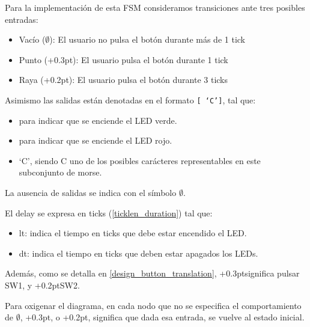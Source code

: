 \documentclass[a4paper,openright,12pt]{article}
\newcommand{\punto}{\kern+0.3pt\raisebox{0.35ex}{\huge\textbf.}}
\newcommand{\raya}{\kern+0.2pt\raisebox{-0.35ex}{\huge\textbf-}}
\begin{document}
Para la implementación de esta FSM consideramos transiciones ante tres posibles entradas:
\begin{itemize}
    \item Vacío ($\emptyset$): El usuario no pulsa el botón durante más de 1 tick
    \item Punto (\punto): El usuario pulsa el botón durante 1 tick
    \item Raya (\raya): El usuario pulsa el botón durante 3 ticks
\end{itemize}

Asimismo las salidas están denotadas en el formato \texttt{[\text{\textcolor{green}{\punto}}\text{\textcolor{red}{\punto}} `C']}, tal que:
\begin{itemize}
    \item \text{\textcolor{green}{\punto}} para indicar que se enciende el LED verde.
    \item \text{\textcolor{red}{\punto}} para indicar que se enciende el LED rojo.
    \item `C', siendo C uno de los posibles carácteres representables en este subconjunto de morse.
\end{itemize}

La ausencia de salidas se indica con el símbolo $\emptyset$.
\bigskip

El delay se expresa en ticks (\ref{ticklen_duration}) tal que:
\begin{itemize}
    \item lt: indica el tiempo en ticks que debe estar encendido el LED.
    \item dt: indica el tiempo en ticks que deben estar apagados los LEDs.
\end{itemize}
\bigskip

Además, como se detalla en \ref{design_button_translation}, \punto \space significa pulsar SW1, y \raya \space SW2.
\bigskip

Para oxigenar el diagrama, en cada nodo que no se especifica el comportamiento de $\emptyset$, \punto, o \raya, significa que dada esa entrada, se vuelve al estado inicial.

\clearpage
\end{document}
